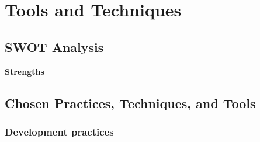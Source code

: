 \section{Tools and Techniques}
\subsection{SWOT Analysis}

\begin{table*}
	\centering
		\begin{tabular}
			\textbf{Strengths}
		\end{tabular}
	\caption{Swot Analysis}
	\label{tab:SwotAnalaysis}
\end{table*}


\subsection{Chosen Practices, Techniques, and Tools}



\subsubsection{Development practices}



